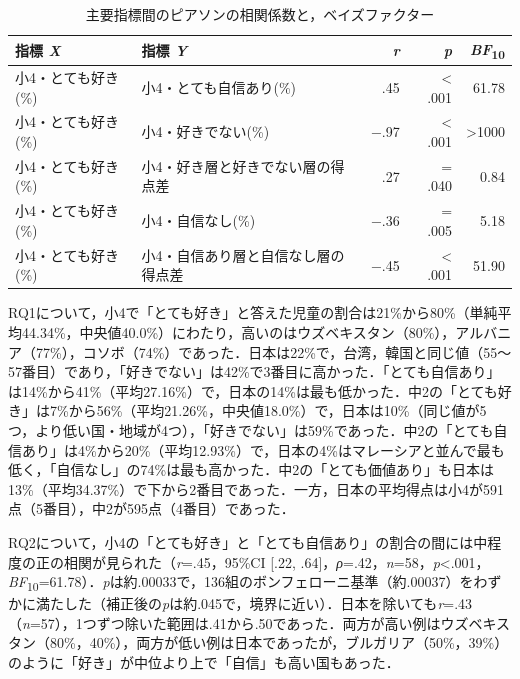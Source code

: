 \documentclass[a4paper,10pt,twocolumn]{ltjsarticle}
\makeatletter
\renewcommand{\section}{\@startsection{section}{1}{\z@}{1.1\Cvs \@plus.4\Cdp \@minus.2\Cdp}{.5\Cvs \@plus.2\Cdp}{\normalfont\gtfamily\bfseries\large}}
\makeatother
\begin{document}
\begin{table}[!t]
\caption{主要指標間のピアソンの相関係数と，ベイズファクター}
\centering\small
\begin{tabular}{>{\raggedright\arraybackslash}p{6.4cm}>{\raggedright\arraybackslash}p{6.4cm}rrr}
\toprule
指標 \textit{X} & 指標 \textit{Y} & \textit{r} & \textit{p} & \textit{BF}\textsubscript{10} \\
\midrule
小4・とても好き(\%) & 小4・とても自信あり(\%) & .45 & < .001 & 61.78 \\
小4・とても好き(\%) & 小4・好きでない(\%) & −.97 & < .001 & >1000 \\
小4・とても好き(\%) & 小4・好き層と好きでない層の得点差 & .27 & = .040 & 0.84 \\
小4・とても好き(\%) & 小4・自信なし(\%) & −.36 & = .005 & 5.18 \\
小4・とても好き(\%) & 小4・自信あり層と自信なし層の得点差 & −.45 & < .001 & 51.90 \\
\bottomrule
\end{tabular}
\par{}
\end{table}
\section{結果}
RQ1について，小4で「とても好き」と答えた児童の割合は21\%から80\%（単純平均44.34\%，中央値40.0\%）にわたり，高いのはウズベキスタン（80\%），アルバニア（77\%），コソボ（74\%）であった．日本は22\%で，台湾，韓国と同じ値（55〜57番目）であり，「好きでない」は42\%で3番目に高かった．「とても自信あり」は14\%から41\%（平均27.16\%）で，日本の14\%は最も低かった．中2の「とても好き」は7\%から56\%（平均21.26\%，中央値18.0\%）で，日本は10\%（同じ値が5つ，より低い国・地域が4つ），「好きでない」は59\%であった．中2の「とても自信あり」は4\%から20\%（平均12.93\%）で，日本の4\%はマレーシアと並んで最も低く，「自信なし」の74\%は最も高かった．中2の「とても価値あり」も日本は13\%（平均34.37\%）で下から2番目であった．一方，日本の平均得点は小4が591点（5番目），中2が595点（4番目）であった．

RQ2について，小4の「とても好き」と「とても自信あり」の割合の間には中程度の正の相関が見られた（\textit{r}=.45，95\%CI [.22, .64]，\textit{ρ}=.42，\textit{n}=58，\textit{p}<.001，\textit{BF}\textsubscript{10}=61.78）．\textit{p}は約.00033で，136組のボンフェローニ基準（約.00037）をわずかに満たした（補正後の\textit{p}は約.045で，境界に近い）．日本を除いても\textit{r}=.43（\textit{n}=57），1つずつ除いた範囲は.41から.50であった．両方が高い例はウズベキスタン（80\%，40\%），両方が低い例は日本であったが，ブルガリア（50\%，39\%）のように「好き」が中位より上で「自信」も高い国もあった．
\end{document}
